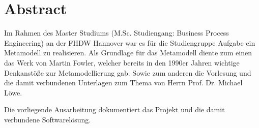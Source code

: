 \section*{Abstract}
Im Rahmen des Master Studiums (M.Sc. Studiengang: Business Process Engineering) an der FHDW Hannover
war es für die Studiengruppe  Aufgabe ein Metamodell zu realisieren. Als Grundlage für das Metamodell diente zum einen das Werk 
  von Martin Fowler, welcher bereits in den 1990er Jahren wichtige Denkanstöße zur Metamodellierung gab. 
Sowie zum anderen die Vorlesung und die damit verbundenen Unterlagen  zum Thema  von Herrn Prof. Dr. Michael Löwe. 

Die vorliegende Ausarbeitung dokumentiert das Projekt  und die damit verbundene Softwarelösung.